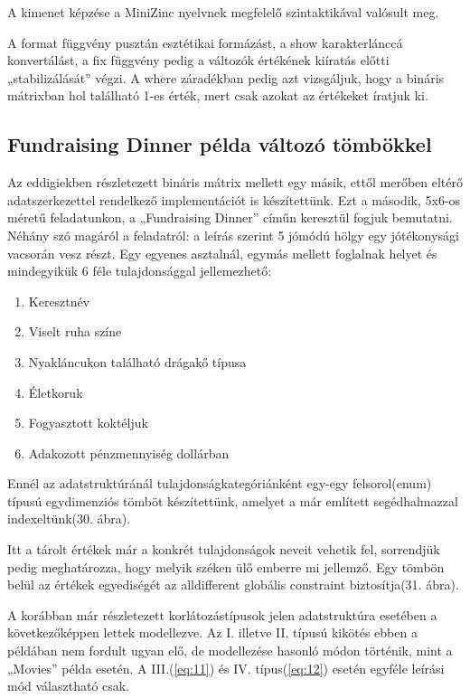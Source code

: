 \documentclass[12pt,a4paper,twoside, openright]{report}
\begin{document}
    A kimenet képzése a MiniZinc nyelvnek megfelelő szintaktikával valósult meg.
    

    A format függvény pusztán esztétikai formázást, a show karakterlánccá konvertálást, a fix függvény pedig a változók értékének kiíratás előtti „stabilizálását” végzi.
    A where záradékban pedig azt vizsgáljuk, hogy a bináris mátrixban hol található 1-es érték, mert csak azokat az értékeket íratjuk ki.

\subsection{Fundraising Dinner példa változó tömbökkel}

    Az eddigiekben részletezett bináris mátrix mellett egy másik, ettől merőben eltérő adatszerkezettel rendelkező implementációt is készítettünk.
    Ezt a második, 5x6-os méretű feladatunkon, a „Fundraising Dinner” címűn keresztül fogjuk bemutatni.
    Néhány szó magáról a feladatról: a leírás szerint 5 jómódú hölgy egy jótékonysági vacsorán vesz részt.
    Egy egyenes asztalnál, egymás mellett foglalnak helyet és mindegyikük 6 féle tulajdonsággal jellemezhető:
    \begin{enumerate}
    	\item Keresztnév
    	\item Viselt ruha színe
    	\item Nyakláncukon található drágakő típusa
    	\item Életkoruk
    	\item Fogyasztott koktéljuk
    	\item Adakozott pénzmennyiség dollárban
    \end{enumerate}
    Ennél az adatstruktúránál tulajdonságkategóriánként egy-egy felsorol(enum) típusú egydimenziós tömböt készítettünk, amelyet a már említett segédhalmazzal indexeltünk(30. ábra).


    Itt a tárolt értékek már a konkrét tulajdonságok neveit vehetik fel, sorrendjük pedig meghatározza, hogy melyik széken ülő emberre mi jellemző.
    Egy tömbön belül az értékek egyediségét az alldifferent globális constraint biztosítja(31. ábra).


    A korábban már részletezett korlátozástípusok jelen adatstruktúra esetében a következőképpen lettek modellezve.
    Az I. illetve II. típusú kikötés ebben a példában nem fordult ugyan elő, de modellezése hasonló módon történik, mint a „Movies” példa esetén.
    A III.(\ref{eq:11}) és IV. típus(\ref{eq:12}) esetén egyféle leírási mód választható csak.
\end{document}
